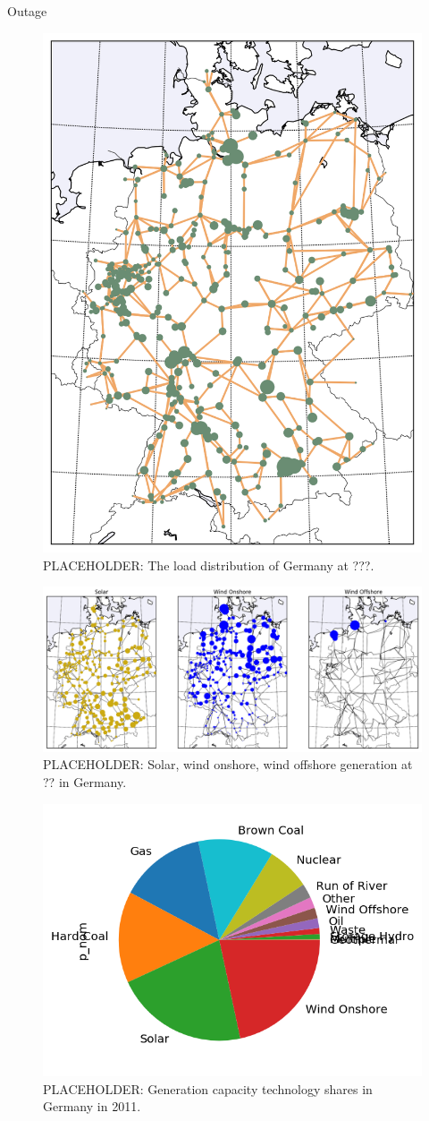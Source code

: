 \documentclass[main.tex]{subfiles}
\begin{document}
Outage


\begin{figure}
    \centering
    \includegraphics[width=.4\textwidth]{img/load.png}
    \caption{PLACEHOLDER: The load distribution of Germany at ???.}
    \label{fig:loaddistribution}
\end{figure}

\begin{figure}
    \centering
    \includegraphics[width=\textwidth]{img/solarwind.png}
    \caption{PLACEHOLDER: Solar, wind onshore, wind offshore generation at ?? in Germany.}
    \label{fig:solarwind}
\end{figure}

\begin{figure}
    \centering
    \includegraphics[width=.4\textwidth]{img/genprop.png}
    \caption{PLACEHOLDER: Generation capacity technology shares in Germany in 2011.}
    \label{fig:generationtech}
\end{figure}
\end{document}
